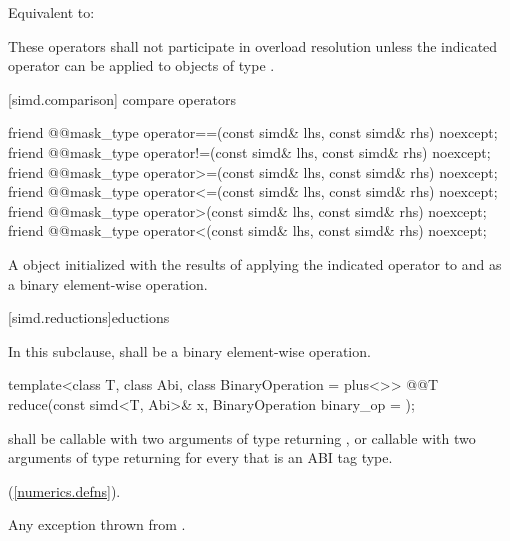 \begin{itemdescr}
  \pnum\effects
  Equivalent to: 

  \pnum\remarks
  These operators shall not participate in overload resolution unless the indicated operator can be applied to objects of type .
\end{itemdescr}

[simd.comparison]{ compare operators}

\begin{itemdecl}
friend @@mask_type operator==(const simd& lhs, const simd& rhs) noexcept;
friend @@mask_type operator!=(const simd& lhs, const simd& rhs) noexcept;
friend @@mask_type operator>=(const simd& lhs, const simd& rhs) noexcept;
friend @@mask_type operator<=(const simd& lhs, const simd& rhs) noexcept;
friend @@mask_type operator>(const simd& lhs, const simd& rhs) noexcept;
friend @@mask_type operator<(const simd& lhs, const simd& rhs) noexcept;
\end{itemdecl}

\begin{itemdescr}
  \pnum\returns
  A  object initialized with the results of applying the indicated operator to  and  as a binary element-wise operation.
\end{itemdescr}

[simd.reductions]{\texorpdfstring{}{simd r}eductions}

\pnum
In this subclause,  shall be a binary element-wise operation.

\begin{itemdecl}
template<class T, class Abi, class BinaryOperation = plus<>>
  @@T reduce(const simd<T, Abi>& x, BinaryOperation binary_op = {});
\end{itemdecl}

\begin{itemdescr}
  \pnum\requires
   shall be callable with two arguments of type  returning , or callable with two arguments of type  returning  for every  that is an ABI tag type.

  \pnum\returns
   \foralli (\ref{numerics.defns}).

  \pnum\throws
  Any exception thrown from .

\end{itemdescr}


